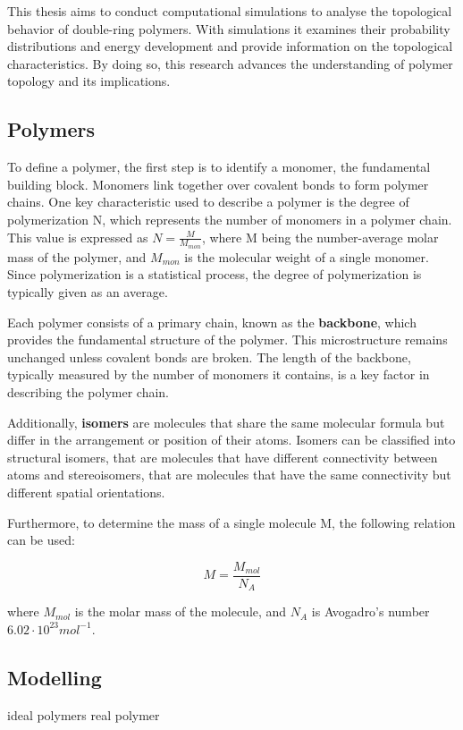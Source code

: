 \documentclass{article}      %
\begin{document}
This thesis aims to conduct computational simulations to analyse the topological behavior of double-ring polymers. With simulations it examines their probability distributions and energy development and provide information on the topological characteristics. By doing so, this research advances the understanding of polymer topology and its implications.

\newpage
  
\subsection{Polymers} 

To define a polymer, the first step is to identify a monomer, the fundamental building block. Monomers link together over covalent bonds to form polymer chains. One key characteristic used to describe a polymer is the degree of polymerization N, which represents the number of monomers in a polymer chain. This value is expressed as $N = \frac{M}{M_{mon}}$, where M being the number-average molar mass of the polymer, and $M_{mon}$ is the molecular weight of a single monomer. Since polymerization is a statistical process, the degree of polymerization is typically given as an average.


Each polymer consists of a primary chain, known as the \textbf{backbone}, which provides the fundamental structure of the polymer. This microstructure remains unchanged unless covalent bonds are broken. The length of the backbone, typically measured by the number of monomers it contains, is a key factor in describing the polymer chain.

Additionally, \textbf{isomers} are molecules that share the same molecular formula but differ in the arrangement or position of their atoms. Isomers can be classified into structural isomers, that are molecules that have different connectivity between atoms and stereoisomers, that are molecules that have the same connectivity but different spatial orientations.

Furthermore, to determine the mass of a single molecule M, the following relation can be used:

\[
M = \frac{M_{mol}}{N_A}
\]

where $M_{mol}$ is the molar mass of the molecule, and $N_A$ is Avogadro's number $6.02 \cdot 10^{23} mol^{-1}$.





\subsection{Modelling}
ideal polymers
real polymer
\end{document}
